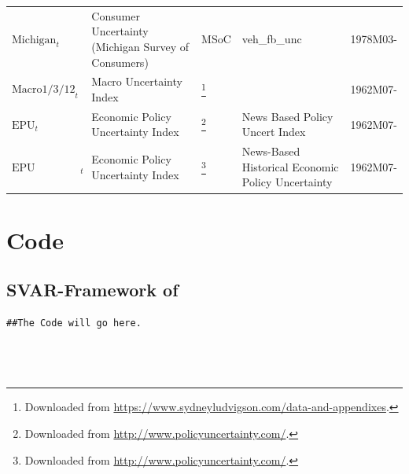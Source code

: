 \documentclass[a4paper,11pt,listof=nochaptergap,oneside,pointednumbers,bibtotoc,bigheadings,liststotoc]{scrbook}
\theoremstyle{mysatz}
\theoremstyle{mydefinition}
\theoremstyle{mytheorem}
\theoremstyle{mybemerkung}
\begin{document}
\begin{table}[!h]
{\begin{tabular}{L{2.7cm}p{5.4cm}p{2.5cm}p{3.4cm}L{2.5cm}}
         $\text{Michigan}_t$ & Consumer Uncertainty (Michigan Survey of Consumers) & MSoC & veh_fb_unc & 1978M03- \\
 	$\text{Macro1/3/12}_t$ & Macro Uncertainty Index & \citet{juradoetal:15}\footnote{Downloaded from \url{https://www.sydneyludvigson.com/data-and-appendixes}.} &  & 1962M07- \\
	$\text{EPU}_t$ & Economic Policy Uncertainty Index & \citet{bakeretal:15}\footnote{Downloaded from \url{http://www.policyuncertainty.com/}.} & News Based Policy Uncert Index & 1962M07- \\
	$\text{EPU Historical}_t$ & Economic Policy Uncertainty Index & \citet{bakeretal:15}\footnote{Downloaded from \url{http://www.policyuncertainty.com/}.} & News-Based Historical Economic Policy Uncertainty & 1962M07- \\
        \bottomrule
\end{tabular}
}
\label{tab:data_sources} %
\end{table}




\fancyhfoffset[E,O]{0pt}
\section{Code}
\label{sec:rcode}

\subsection{SVAR-Framework of \citet{ludvigsonetal:18}}
\label{sec:codeSVAR_LMN}


\begingroup
\fontsize{9pt}{12pt}\selectfont
\begin{verbatim}  
##The Code will go here.




\end{verbatim}  
\endgroup


\restoregeometry

\end{document}
